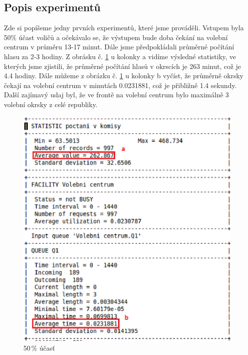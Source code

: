 \documentclass[12pt,a4paper,titlepage,final]{article}
\begin{document}
\subsection{Popis experimentů}
Zde si popíšeme jedny prvních experimentů, které jsme prováděli.
Vstupem byla 50\% účast voličů a očekávalo se, že výstupem bude doba čekání na volební centrum v průměru 13-17 minut. Dále jsme předpokládali průměrné počítání hlasu za 2-3 hodiny. Z obrásku č. \ref{obr3} u kolonky a vidíme výsledné statistiky, ve kterých jsme zjistili, že průměrné počítání hlasů v okrscích je 263 minut, což je 4.4 hodiny. Dále můžeme z obrázku č. \ref{obr3} u kolonky b vyčíst, že průměrně okrsky čekají na volební centrum v minutách 0.0231881, což je přibližně 1.4 sekundy. Další zajímavý udaj byl, že ve frontě na volební centrum bylo maximálně 3 volební okrsky z celé republiky. \newline
\newline
\begin{figure}[h]

\begin{center}

\includegraphics[scale=0.7]{img/0_5.eps} 
\caption{50\,\% účasť}
\label{obr3}

\end{center}

\end{figure}
\end{document}
